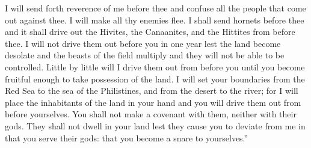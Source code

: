 \begin{inparaenum}
   I will send forth reverence of me before thee and confuse all the people that come out against thee. I will make all thy enemies flee.%
   I shall send hornets before thee and it shall drive out the Hivites, the Canaanites, and the Hittites from before thee.%
   I will not drive them out before you in one year lest the land become desolate and the beasts of the field multiply and they will not be able to be controlled.%
   Little by little will I drive them out from before you until you become fruitful enough to take possession of the land.%
   I will set your boundaries from the Red Sea to the sea of the Philistines, and from the desert to the river; for I will place the inhabitants of the land in your hand and you will drive them out from before yourselves.%
   You shall not make a covenant with them, neither with their gods.%
   They shall not dwell in your land lest they cause you to deviate from me in that you serve their gods: that you become a snare to yourselves.''%
\end{inparaenum}
